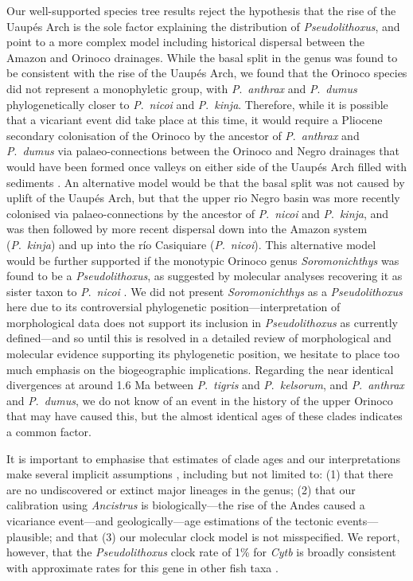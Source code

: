 \documentclass[12pt]{article}
\begin{document}
Our well-supported species tree results reject the hypothesis that the rise of the Uaupés Arch is the sole factor explaining the distribution of \emph{Pseudolithoxus}, and point to a more complex model including historical dispersal between the Amazon and Orinoco drainages. %
While the basal split in the genus was found to be consistent with the rise of the Uaupés Arch, we found that the Orinoco species did not represent a monophyletic group, with \emph{P}.\ \emph{anthrax} and \emph{P}.\ \emph{dumus} phylogenetically closer to \emph{P}.\ \emph{nicoi} and \emph{P}.\ \emph{kinja}. %
Therefore, while it is possible that a vicariant event did take place at this time, it would require a Pliocene secondary colonisation of the Orinoco by the ancestor of \emph{P}.\ \emph{anthrax} and \emph{P}.\ \emph{dumus} via palaeo-connections between the Orinoco and Negro drainages that would have been formed once valleys on either side of the Uaupés Arch filled with sediments \citep{Winemiller2011}. %
An alternative model would be that the basal split was not caused by uplift of the Uaupés Arch, but that the upper rio Negro basin was more recently colonised via palaeo-connections by the ancestor of \emph{P}.\ \emph{nicoi} and \emph{P}.\ \emph{kinja}, and was then followed by more recent dispersal down into the Amazon system (\emph{P}.\ \emph{kinja}) and up into the río Casiquiare (\emph{P}.\ \emph{nicoi}). %
This alternative model would be further supported if the monotypic Orinoco genus \emph{Soromonichthys} was found to be a \emph{Pseudolithoxus}, as suggested by molecular analyses recovering it as sister taxon to \emph{P}.\ \emph{nicoi} \citep[][exploratory analyses this study]{Lujan2015phylo}. %
We did not present \emph{Soromonichthys} as a \emph{Pseudolithoxus} here due to its controversial phylogenetic position---interpretation of morphological data does not support its inclusion in \emph{Pseudolithoxus} as currently defined---and so until this is resolved in a detailed review of morphological and molecular evidence supporting its phylogenetic position, we hesitate to place too much emphasis on the biogeographic implications. %
Regarding the near identical divergences at around 1.6 Ma between \emph{P}.\ \emph{tigris} and \emph{P}.\ \emph{kelsorum}, and \emph{P}.\ \emph{anthrax} and \emph{P}.\ \emph{dumus}, we do not know of an event in the history of the upper Orinoco that may have caused this, but the almost identical ages of these clades indicates a common factor.%

It is important to emphasise that estimates of clade ages and our interpretations make several implicit assumptions \citep[e.g.][]{Duchene2014,Ho2014,Lovejoy2010}, including but not limited to: (1) that there are no undiscovered or extinct major lineages in the genus; (2) that our calibration using \emph{Ancistrus} is biologically---the rise of the Andes caused a vicariance event---and geologically---age estimations of the tectonic events---plausible; and that (3) our molecular clock model is not misspecified. %
We report, however, that the \emph{Pseudolithoxus} clock rate of 1\% for \emph{Cytb} is broadly consistent with approximate rates for this gene in other fish taxa \citep[e.g.\ 0.74-0.92\%;][]{Ruber2004}.%
\end{document}
